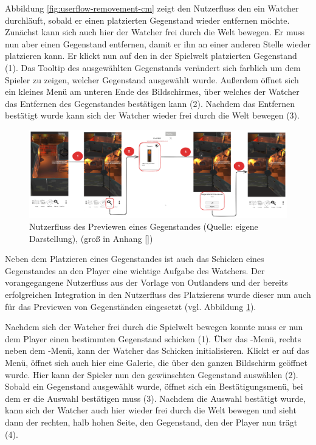 Abbildung \ref{fig:userflow-removement-cm} zeigt den Nutzerfluss den ein Watcher durchläuft, sobald er einen platzierten Gegenstand wieder entfernen möchte. Zunächst kann sich auch hier der Watcher frei durch die Welt bewegen. Er muss nun aber einen Gegenstand entfernen, damit er ihn an einer anderen Stelle wieder platzieren kann. Er klickt nun auf den in der Spielwelt platzierten Gegenstand (1). Das Tooltip des ausgewählten Gegenstands verändert sich farblich um dem Spieler zu zeigen, welcher Gegenstand ausgewählt wurde. Außerdem öffnet sich ein kleines Menü am unteren Ende des Bildschirmes, über welches der Watcher das Entfernen des Gegenstandes bestätigen kann (2). Nachdem das Entfernen bestätigt wurde kann sich der Watcher wieder frei durch die Welt bewegen (3).

\begin{figure}[ht]
\centering
\includegraphics[width=1\linewidth]{content/pictures/PreviewFlow.png}
\caption{Nutzerfluss des Previewen eines Gegenstandes (Quelle: eigene Darstellung), (groß in Anhang \ref{})}
\label{fig:userflow-preview-cm}
\end{figure}

Neben dem Platzieren eines Gegenstandes ist auch das Schicken eines Gegenstandes an den Player eine wichtige Aufgabe des Watchers. Der vorangegangene Nutzerfluss aus der Vorlage von Outlanders und der bereits erfolgreichen Integration in den Nutzerfluss des Platzierens wurde dieser nun auch für das Previewen von Gegenständen eingesetzt (vgl. Abbildung \ref{fig:userflow-preview-cm}).

Nachdem sich der Watcher frei durch die Spielwelt bewegen konnte muss er nun dem Player einen bestimmten Gegenstand schicken (1). Über das -Menü, rechts neben dem -Menü, kann der Watcher das Schicken initialisieren. Klickt er auf das Menü, öffnet sich auch hier eine Galerie, die über den ganzen Bildschirm geöffnet wurde. Hier kann der Spieler nun den gewünschten Gegenstand auswählen (2). Sobald ein Gegenstand ausgewählt wurde, öffnet sich ein Bestätigungsmenü, bei dem er die Auswahl bestätigen muss (3). Nachdem die Auswahl bestätigt wurde, kann sich der Watcher auch hier wieder frei durch die Welt bewegen und sieht dann der rechten, halb hohen Seite, den Gegenstand, den der Player nun trägt (4).

